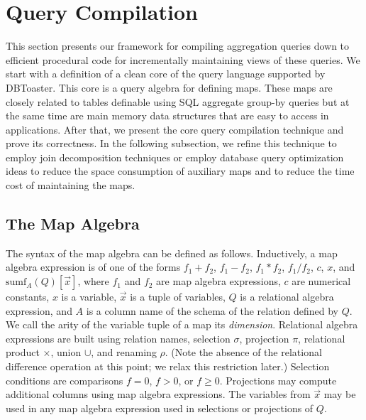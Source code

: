 \section{Query Compilation}


\def\algsum{\mathrm{sum}}
\def\algagg{\mathrm{agg}}
\def\algtop{\mathrm{top}}
\def\algtopk{\mathrm{topk}}



This section presents our framework for compiling aggregation queries down to
efficient procedural code for incrementally maintaining views of these queries.
We start with a definition of a clean
core of the query language supported by DBToaster.
This core is a query algebra for defining maps. These maps are closely related to
tables definable using SQL aggregate group-by queries but at the same time are main
memory data structures that are easy to access in applications.
After that, we present the core query compilation technique and prove its correctness.
In the following subsection, we refine this technique to employ join decomposition
techniques or employ database query optimization ideas to reduce the space
consumption of auxiliary maps and to reduce the time cost of maintaining the maps.




\subsection{The Map Algebra}


\def\algsumr{\mbox{sumr}}
\def\algsumf{\mbox{sumf}}
\def\distinct{\mbox{distinct}}
\def\routerjoin{\bowtie\!=}


The syntax of the map algebra can be defined as follows.
Inductively, a map algebra expression is of one of the forms $f_1 + f_2$,
$f_1 - f_2$, $f_1 * f_2$, $f_1 / f_2$, $c$, $x$, and $\algsumf_A(Q)[\vec{x}]$,
where $f_1$ and $f_2$ are map algebra expressions, $c$ are numerical constants,
$x$ is a variable, $\vec{x}$ is a tuple of variables, $Q$ is a relational algebra
expression, and $A$ is a column name of the schema of the relation defined by $Q$.
We call the arity of the variable tuple of a map its {\em dimension}\/.
Relational algebra expressions are built using relation names,
selection $\sigma$, projection $\pi$, relational product $\times$, union $\cup$,
and renaming $\rho$. (Note the absence of the relational difference operation
at this point; we
relax this restriction later.) Selection conditions are comparisons
$f = 0$, $f > 0$, or $f \ge 0$.
Projections may compute additional columns
using map algebra expressions. 
The variables from $\vec{x}$ may be used in
any map algebra expression used in selections or projections of $Q$.

